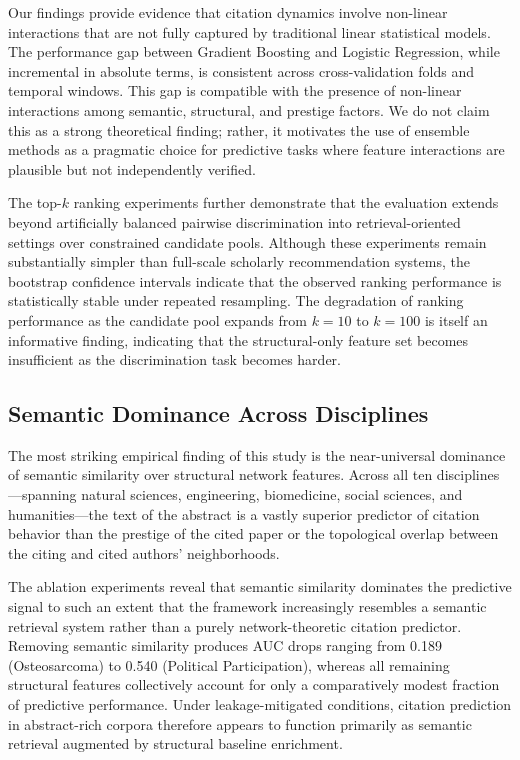 \documentclass[11pt,a4paper]{article}
\begin{document}
Our findings provide evidence that citation dynamics involve non-linear interactions that are not fully captured by traditional linear statistical models. The performance gap between Gradient Boosting and Logistic Regression, while incremental in absolute terms, is consistent across cross-validation folds and temporal windows. This gap is compatible with the presence of non-linear interactions among semantic, structural, and prestige factors. We do not claim this as a strong theoretical finding; rather, it motivates the use of ensemble methods as a pragmatic choice for predictive tasks where feature interactions are plausible but not independently verified.

The top-\(k\) ranking experiments further demonstrate that the evaluation extends beyond artificially balanced pairwise discrimination into retrieval-oriented settings over constrained candidate pools. Although these experiments remain substantially simpler than full-scale scholarly recommendation systems, the bootstrap confidence intervals indicate that the observed ranking performance is statistically stable under repeated resampling. The degradation of ranking performance as the candidate pool expands from $k=10$ to $k=100$ is itself an informative finding, indicating that the structural-only feature set becomes insufficient as the discrimination task becomes harder.

\subsection{Semantic Dominance Across Disciplines}

The most striking empirical finding of this study is the near-universal dominance of semantic similarity over structural network features. Across all ten disciplines---spanning natural sciences, engineering, biomedicine, social sciences, and humanities---the text of the abstract is a vastly superior predictor of citation behavior than the prestige of the cited paper or the topological overlap between the citing and cited authors' neighborhoods.

The ablation experiments reveal that semantic similarity dominates the predictive signal to such an extent that the framework increasingly resembles a semantic retrieval system rather than a purely network-theoretic citation predictor. Removing semantic similarity produces AUC drops ranging from 0.189 (Osteosarcoma) to 0.540 (Political Participation), whereas all remaining structural features collectively account for only a comparatively modest fraction of predictive performance. Under leakage-mitigated conditions, citation prediction in abstract-rich corpora therefore appears to function primarily as semantic retrieval augmented by structural baseline enrichment.
\end{document}

